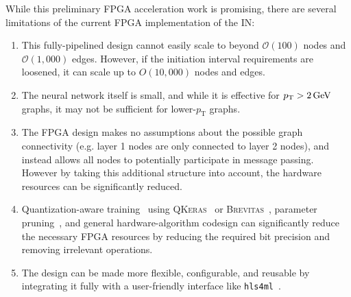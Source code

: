 \documentclass[twocolumn]{svjour3}
\newcommand{\pt}{\ensuremath{p_{\mathrm{T}}}\xspace}
\newcommand{\GeV}{\ensuremath{\,\text{Ge\hspace{-.08em}V}}\xspace}
\begin{document}
While this preliminary FPGA acceleration work is promising, there are several limitations of the current FPGA implementation of the IN:
\begin{enumerate}
    \item This fully-pipelined design cannot easily scale to beyond $\mathcal O(100)$ nodes and $\mathcal O(1,000)$ edges. However, if the initiation interval requirements are loosened, it can scale up to $O(10,000)$ nodes and edges.
    \item The neural network itself is small, and while it is effective for $\pt> 2\GeV$ graphs, it may not be sufficient for lower-$\pt$ graphs.
    \item The FPGA design makes no assumptions about the possible graph connectivity (e.g. layer 1 nodes are only connected to layer 2 nodes), and instead allows all nodes to potentially participate in message passing. 
    However by taking this additional structure into account, the hardware resources can be significantly reduced.
    \item Quantization-aware training~\cite{bertmoons,NIPS2015_5647,zhang2018lq,ternary-16,zhou2016dorefa,JMLR:v18:16-456,xnornet,micikevicius2017mixed,Zhuang_2018_CVPR,wang2018training,bnnpaper} using \textsc{QKeras}~\cite{Coelho:2020zfu,qkeras} or \textsc{Brevitas}~\cite{FINNR,brevitas}, parameter pruning~\cite{optimalbraindamage,han2016deep,lotteryticket,supermask,stateofpruning,Hawks:2021ruw}, and general hardware-algorithm codesign can significantly reduce the necessary FPGA resources by reducing the required bit precision and removing irrelevant operations.
    \item The design can be made more flexible, configurable, and reusable by integrating it fully with a user-friendly interface like \texttt{hls4ml}~\cite{hls4ml}.
\end{enumerate}



\end{document}
